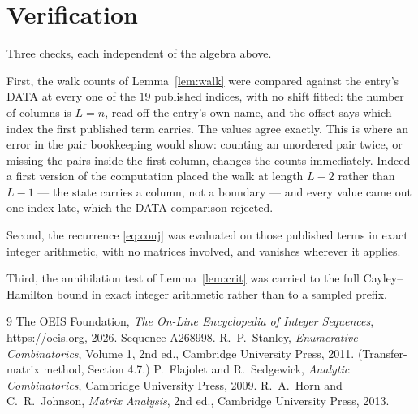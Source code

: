 \documentclass[11pt,a4paper]{article}
\theoremstyle{plain}
\theoremstyle{definition}
\begin{document}
\section{Verification}

Three checks, each independent of the algebra above.

First, the walk counts of Lemma~\ref{lem:walk} were compared against the entry's DATA at
every one of the $19$ published indices, with no shift fitted: the number of columns is
$L=n$, read off the entry's own name, and the offset says which index the first
published term carries. The values agree exactly. This is where an error in the pair
bookkeeping would show: counting an unordered pair twice, or missing the pairs inside the
first column, changes the counts immediately. Indeed a first version of the computation
placed the walk at length $L-2$ rather than $L-1$ --- the state carries a column, not a
boundary --- and every value came out one index late, which the DATA comparison rejected.

Second, the recurrence \eqref{eq:conj} was evaluated on those published terms in exact
integer arithmetic, with no matrices involved, and vanishes wherever it applies.

Third, the annihilation test of Lemma~\ref{lem:crit} was carried to the full
Cayley--Hamilton bound in exact integer arithmetic rather than to a sampled prefix.

\begin{thebibliography}{9}
 The OEIS Foundation, \emph{The On-Line Encyclopedia of Integer
Sequences}, \url{https://oeis.org}, 2026. Sequence A268998.
 R.~P.~Stanley, \emph{Enumerative Combinatorics}, Volume 1, 2nd ed.,
Cambridge University Press, 2011. (Transfer-matrix method, Section 4.7.)
 P.~Flajolet and R.~Sedgewick, \emph{Analytic Combinatorics}, Cambridge
University Press, 2009.
 R.~A.~Horn and C.~R.~Johnson, \emph{Matrix Analysis}, 2nd ed., Cambridge
University Press, 2013.
\end{thebibliography}
\end{document}
